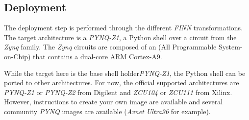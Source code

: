 
\subsection{Deployment}

The deployment step is performed through the different \emph{FINN} transformations. The target architecture is a \emph{PYNQ-Z1}, a Python shell over a circuit from the \emph{Zynq} family. The \emph{Zynq} circuits are composed of an  (All Programmable System-on-Chip) that contains a dual-core ARM Cortex-A9.

While the target here is the base shell holder\emph{PYNQ-Z1}, the Python shell can be ported to other architectures. For now, the official supported architectures are \emph{PYNQ-Z1} or \emph{PYNQ-Z2} from Digilent and \emph{ZCU104} or \emph{ZCU111} from Xilinx. However, instructions to create your own image are available and several community \emph{PYNQ} images are available (\emph{Avnet Ultra96} for example).

